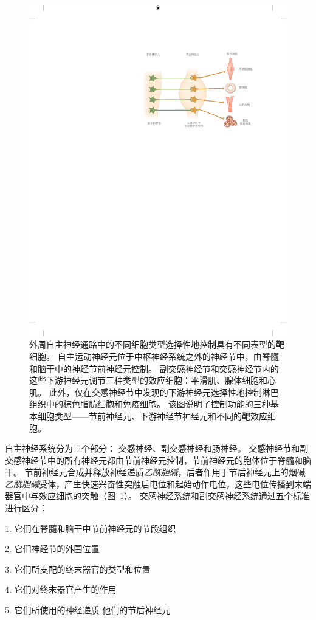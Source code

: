 \begin{figure}[htbp]
	\centering
	\includegraphics[width=0.7\linewidth]{chap41/fig_41_3}
	\caption{外周自主神经通路中的不同细胞类型选择性地控制具有不同表型的靶细胞。
		自主运动神经元位于中枢神经系统之外的神经节中，由脊髓和脑干中的神经节前神经元控制。
		副交感神经节和交感神经节内的这些下游神经元调节三种类型的效应细胞：平滑肌、腺体细胞和心肌。
		此外，仅在交感神经节中发现的下游神经元选择性地控制淋巴组织中的棕色脂肪细胞和免疫细胞。
		该图说明了控制功能的三种基本细胞类型——节前神经元、下游神经节神经元和不同的靶效应细胞。}
	\label{fig:41_3}
\end{figure}


自主神经系统分为三个部分：
交感神经、副交感神经和肠神经。
交感神经节和副交感神经节中的所有神经元都由节前神经元控制，节前神经元的胞体位于脊髓和脑干。
节前神经元合成并释放神经递质\textit{乙酰胆碱}，后者作用于节后神经元上的烟碱\textit{乙酰胆碱}受体，产生快速兴奋性突触后电位和起始动作电位，这些电位传播到末端器官中与效应细胞的突触（图~\ref{fig:41_3}）。 
交感神经系统和副交感神经系统通过五个标准进行区分：

1. 它们在脊髓和脑干中节前神经元的节段组织 

2. 它们神经节的外围位置 

3. 它们所支配的终末器官的类型和位置 

4. 它们对终末器官产生的作用 

5. 它们所使用的神经递质 他们的节后神经元



